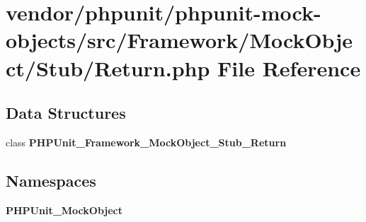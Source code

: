 \section{vendor/phpunit/phpunit-\/mock-\/objects/src/\+Framework/\+Mock\+Object/\+Stub/\+Return.php File Reference}
\label{_return_8php}
\subsection*{Data Structures}
\begin{DoxyCompactItemize}
\item 
class {\bf P\+H\+P\+Unit\+\_\+\+Framework\+\_\+\+Mock\+Object\+\_\+\+Stub\+\_\+\+Return}
\end{DoxyCompactItemize}
\subsection*{Namespaces}
\begin{DoxyCompactItemize}
\item 
 {\bf P\+H\+P\+Unit\+\_\+\+Mock\+Object}
\end{DoxyCompactItemize}
